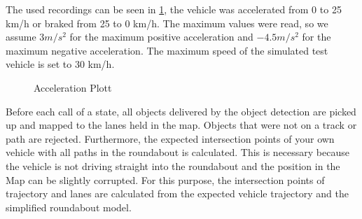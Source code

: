 \documentclass[11pt,oneside,openright]{mpreport}
\begin{document}
The used recordings can be seen in \cref{max_accel}, the vehicle was accelerated from 0 to 25 km/h or braked from 25 to 0 km/h.
The maximum values were read, so we assume $ 3m/{s^2} $ for the maximum positive acceleration and $ -4.5m/{s ^ 2} $ for the maximum negative acceleration.
The maximum speed of the simulated test vehicle is set to 30 km/h.




\begin{figure}[!ht]
\caption{Acceleration Plott}
\begin{center}
\label{max_accel}
\end{center}
\end{figure}


Before each call of a state, all objects delivered by the object detection are picked up and mapped to the lanes held in the map.
Objects that were not on a track or path are rejected.
Furthermore, the expected intersection points of your own vehicle with all paths in the roundabout is calculated. 
This is necessary because the vehicle is not driving straight into the roundabout and the position in the Map can be slightly corrupted. For this purpose,
the intersection points of trajectory and lanes are calculated from the expected vehicle trajectory and the simplified roundabout model.
\end{document}
